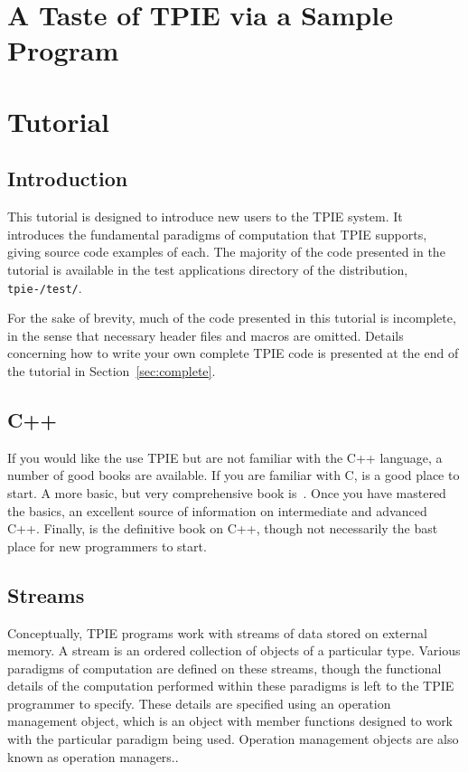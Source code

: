 \chapter{A Taste of TPIE via a Sample Program}
\label{ch:samplepgm}


\chapter{Tutorial}
\label{ch:tutorial}

\section{Introduction}

This tutorial is designed to introduce new users to the TPIE system.
It introduces the fundamental paradigms of computation that TPIE
supports, giving source code examples of each.  The majority of the
code presented in the tutorial is available in the test
applications directory of the distribution, 
{\tt tpie-\version/test/}.

For the sake of brevity, much of the code presented in this tutorial
is incomplete, in the sense that necessary header files 
 and macros are omitted.  Details 
concerning how to write your own complete TPIE code is presented at
the end of the tutorial in Section~\ref{sec:complete}.

\section{C++}

If you would like the use TPIE but are not familiar with the
C++ language, a number of good books are available.  If you
are familiar with C, \cite{pohl:c++} is a good place to
start.  A more basic, but very comprehensive book
is~\cite{deitel:c++}.  Once you have mastered the basics,
\cite{meyers:effective} an excellent source of information on
intermediate and advanced C++.  Finally, \cite{ellis:arm} is the
definitive book on C++, though not necessarily the bast place for new
programmers to start.


\section{Streams}

Conceptually, TPIE programs work with streams of data stored on
external memory.  A stream is an ordered collection of objects of a
particular type.  Various paradigms of computation are defined on
these streams, though the functional details of the computation
performed within these paradigms is left to the TPIE programmer to
specify.  These details are specified using an operation management
object, which is an object with
member functions designed to work with the particular paradigm being
used.  Operation management objects are also known as operation
managers..

